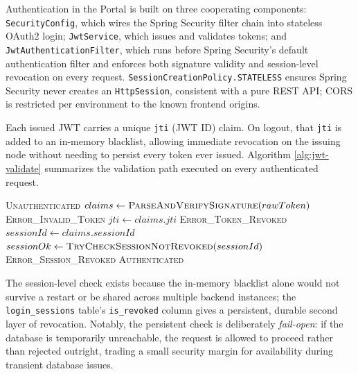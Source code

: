 \documentclass[12pt,a4paper]{report}
\begin{document}
Authentication in the Portal is built on three cooperating components:
\texttt{SecurityConfig}, which wires the Spring Security filter chain
into stateless OAuth2 login; \texttt{JwtService}, which issues and
validates tokens; and \texttt{JwtAuthenticationFilter}, which runs
before Spring Security's default authentication filter and enforces
both signature validity and session-level revocation on every request.
\texttt{SessionCreationPolicy.STATELESS} ensures Spring Security never
creates an \texttt{HttpSession}, consistent with a pure REST API; CORS
is restricted per environment to the known frontend origins.

Each issued JWT carries a unique \texttt{jti} (JWT ID) claim. On
logout, that \texttt{jti} is added to an in-memory blacklist, allowing
immediate revocation on the issuing node without needing to persist
every token ever issued. Algorithm \ref{alg:jwt-validate} summarizes the
validation path executed on every authenticated request.

\begin{algorithm}[htbp]
\caption{JWT Validation with Session Revocation Check}
\label{alg:jwt-validate}
\begin{algorithmic}[1]
    \State \Return \textsc{Unauthenticated}
  \EndIf
  \State $claims \gets \Call{ParseAndVerifySignature}{rawToken}$
    \State \Return \textsc{Error\_Invalid\_Token}
  \EndIf
  \State $jti \gets claims.jti$
    \State \Return \textsc{Error\_Token\_Revoked}
  \EndIf
  \State $sessionId \gets claims.sessionId$
    \State $sessionOk \gets \Call{TryCheckSessionNotRevoked}{sessionId}$
      \State \Return \textsc{Error\_Session\_Revoked}
    \EndIf
  \EndIf
  \State {}
  \State \Return \textsc{Authenticated}
\EndProcedure
\end{algorithmic}
\end{algorithm}

The session-level check exists because the in-memory blacklist alone
would not survive a restart or be shared across multiple backend
instances; the \texttt{login\_sessions} table's \texttt{is\_revoked}
column gives a persistent, durable second layer of revocation. Notably,
the persistent check is deliberately \emph{fail-open}: if the database
is temporarily unreachable, the request is allowed to proceed rather
than rejected outright, trading a small security margin for
availability during transient database issues.
\end{document}
